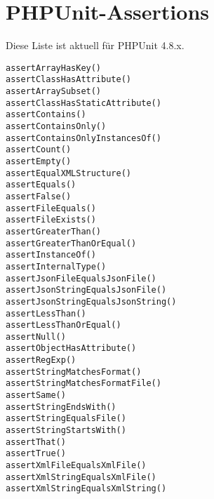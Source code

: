\documentclass[a4paper,10pt]{scrartcl}
\begin{document}
\section{PHPUnit-Assertions}
Diese Liste ist aktuell für PHPUnit 4.8.x.

\begin{verbatim}
assertArrayHasKey()
assertClassHasAttribute()
assertArraySubset()
assertClassHasStaticAttribute()
assertContains()
assertContainsOnly()
assertContainsOnlyInstancesOf()
assertCount()
assertEmpty()
assertEqualXMLStructure()
assertEquals()
assertFalse()
assertFileEquals()
assertFileExists()
assertGreaterThan()
assertGreaterThanOrEqual()
assertInstanceOf()
assertInternalType()
assertJsonFileEqualsJsonFile()
assertJsonStringEqualsJsonFile()
assertJsonStringEqualsJsonString()
assertLessThan()
assertLessThanOrEqual()
assertNull()
assertObjectHasAttribute()
assertRegExp()
assertStringMatchesFormat()
assertStringMatchesFormatFile()
assertSame()
assertStringEndsWith()
assertStringEqualsFile()
assertStringStartsWith()
assertThat()
assertTrue()
assertXmlFileEqualsXmlFile()
assertXmlStringEqualsXmlFile()
assertXmlStringEqualsXmlString()
\end{verbatim}
\end{document}
